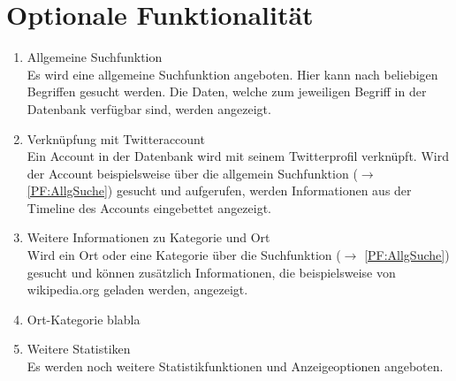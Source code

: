 \section{Optionale Funktionalität}

\begin{enumerate}[ align=left, label={\textbf{\textbackslash F50\arabic*0\textbackslash}}]
	\item Allgemeine Suchfunktion \label{PF:AllgSuche} \\
	Es wird eine allgemeine Suchfunktion angeboten. Hier kann nach beliebigen Begriffen gesucht werden. Die  Daten, welche zum jeweiligen Begriff in der Datenbank verfügbar sind, werden angezeigt.
	\item Verknüpfung mit Twitteraccount \label{PF:Verknuepfung} \\
	Ein Account in der Datenbank wird mit seinem Twitterprofil verknüpft. Wird der Account beispielsweise über die allgemein Suchfunktion ($\rightarrow$ \ref{PF:AllgSuche}) gesucht und aufgerufen, werden Informationen aus der Timeline des Accounts eingebettet angezeigt. 
	\item Weitere Informationen zu Kategorie und Ort \label{PF:WeiterInfos} \\
	Wird ein Ort oder eine Kategorie über die Suchfunktion ($\rightarrow$ \ref{PF:AllgSuche}) gesucht und können zusätzlich Informationen, die beispielsweise von wikipedia.org geladen werden, angezeigt.
	\item Ort-Kategorie blabla
	\item Weitere Statistiken \label{PF:Statistiken} \\
	Es werden noch weitere Statistikfunktionen und Anzeigeoptionen angeboten.
\end{enumerate}
